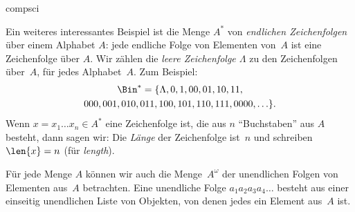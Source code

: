 \documentclass[../../../include/open-logic-section]{subfiles}
\begin{document}
\begin{tagblock}{compsci}
\begin{ex}[Zeichenfolgen] 
Ein weiteres interessantes Beispiel ist die Menge $A^{*}$ von \emph{endlichen Zeichenfolgen}
über einem Alphabet $A$: jede endliche Folge von Elementen von~$A$
ist eine Zeichenfolge über $A$. Wir zählen die \emph{leere Zeichenfolge $\Lambda$}
zu den Zeichenfolgen über~$A$, für jedes Alphabet~$A$. Zum Beispiel:
\begin{multline*}
\Bin^*
=\{\Lambda,0,1,00,01,10,11,\\
000,001,010,011,100,101,110,111,0000,\ldots\}.
\end{multline*}
Wenn $x=x_{1}\ldots x_{n}\in A^{*}$ eine Zeichenfolge ist, die aus $n$
``Buchstaben'' aus $A$ besteht, dann sagen wir: Die \emph{Länge} der Zeichenfolge ist~$n$
und schreiben $\len{x}=n$ (für \emph{length}).
\end{ex}
\end{tagblock}

\begin{ex}
Für jede Menge $A$ können wir auch die Menge~$A^\omega$ der unendlichen
Folgen von Elementen aus~$A$ betrachten. Eine unendliche Folge
$a_1a_2a_3a_4\dots$ besteht aus einer einseitig unendlichen Liste von Objekten,
von denen jedes ein Element aus~$A$ ist.
\end{ex}
\end{document}

